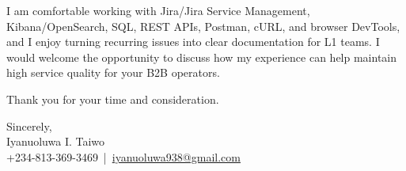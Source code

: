 \documentclass[a4paper, 12pt]{article}
\begin{document}
	I am comfortable working with Jira/Jira Service Management, Kibana/OpenSearch,
	SQL, REST APIs, Postman, cURL, and browser DevTools, and I enjoy turning
	recurring issues into clear documentation for L1 teams. I would welcome the
	opportunity to discuss how my experience can help maintain high service
	quality for your B2B operators.

	Thank you for your time and consideration.

	\vspace{10pt}

	\noindent
	Sincerely,\\ Iyanuoluwa I. Taiwo\\ +234-813-369-3469 \,|\, \href{mailto:iyanuoluwa938@gmail.com}{iyanuoluwa938@gmail.com}
\end{document}
